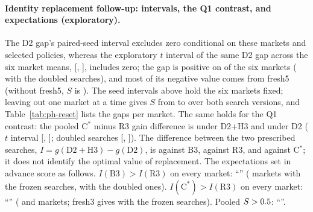 \documentclass[11pt]{article}
\begin{document}
\paragraph{Identity replacement follow-up: intervals, the Q1 contrast, and expectations (exploratory).} The D2 gap's paired-seed interval excludes zero conditional on these markets and selected policies, whereas the exploratory $t$ interval of the same D2 gap across the six market means, [, ], includes zero; the gap is positive on  of the six markets ( with the doubled searches), and most of its negative value comes from fresh5 (without fresh5, $S$ is ). The seed intervals above hold the six markets fixed; leaving out one market at a time gives $S$ from  to  over both search versions, and Table~\ref{tab:ph-reset} lists the gaps per market. The same holds for the Q1 contrast: the pooled C$^*$ minus R3 gain difference is  under D2+H3 and  under D2 ($t$ interval [, ]; doubled searches [, ]). The difference between the two prescribed searches, $I = g(\mathrm{D2{+}H3}) - g(\mathrm{D2})$, is  against B3,  against R3, and  against C$^*$; it does not identify the optimal value of replacement. The expectations set in advance score as follows. $I(\mathrm{B3}) > I(\mathrm{R3})$ on every market: ``'' ( markets with the frozen searches,  with the doubled ones). $I(\mathrm{C}^*) > I(\mathrm{R3})$ on every market: ``'' ( and  markets; fresh3 gives  with the frozen searches). Pooled $S > 0.5$: ``''.
\end{document}
